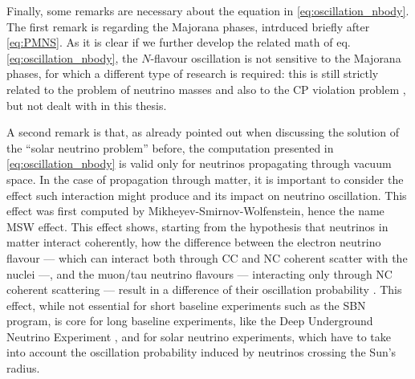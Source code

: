 Finally, some remarks are necessary about the equation in \eqref{eq:oscillation_nbody}. The first remark is regarding the Majorana phases, intrduced briefly after \eqref{eq:PMNS}. As it is clear if we further develop the related math of eq. \eqref{eq:oscillation_nbody}, the $N$-flavour oscillation is not sensitive to the Majorana phases, for which a different type of research is required: this is still strictly related to the problem of neutrino masses and also to the CP violation problem \cite{brancoMajoranaNeutrinosCP1986, navasReviewParticlePhysics2024}, but not dealt with in this thesis.

A second remark is that, as already pointed out when discussing the solution of the ``solar neutrino problem'' before, the computation presented in  \eqref{eq:oscillation_nbody} is valid only for neutrinos propagating through vacuum space. In the case of propagation through matter, it is important to consider the effect such interaction might produce and its impact on neutrino oscillation. This effect was first computed by Mikheyev-Smirnov-Wolfenstein, hence the name MSW effect. This effect shows, starting from the hypothesis that neutrinos in matter interact coherently, how the difference between the electron neutrino flavour --- which can interact both through CC and NC coherent scatter with the nuclei ---, and the muon/tau neutrino flavours --- interacting only through NC coherent scattering --- result in a difference of their oscillation probability \cite{mikheevResonantAmplificationNeutrino1986, mikheyevResonanceAmplificationOscillations1985, wolfensteinNeutrinoOscillationsMatter1978}. This effect, while not essential for short baseline experiments such as the SBN program, is core for long baseline experiments, like the Deep Underground Neutrino Experiment \cite{kellyMatterDensityProfile2018}, and for solar neutrino experiments, which have to take into account the oscillation probability induced by neutrinos crossing the Sun's radius. 

